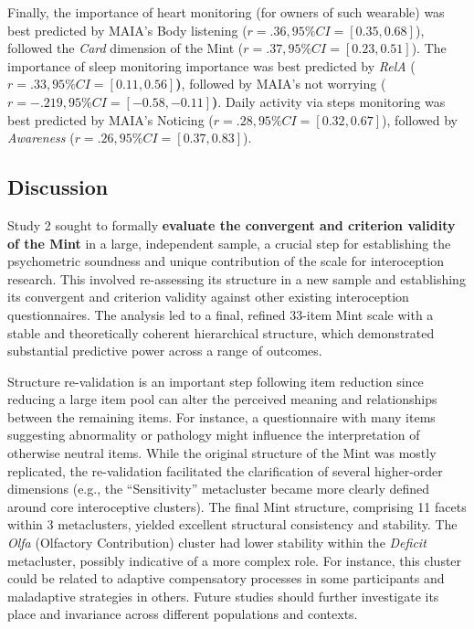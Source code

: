 \documentclass[
  man,
  floatsintext,
  longtable,
  nolmodern,
  notxfonts,
  notimes,
  mask,
  colorlinks=true,linkcolor=blue,citecolor=blue,urlcolor=blue]{apa7}
\begin{document}
Finally, the importance of heart monitoring (for owners of such
wearable) was best predicted by MAIA's Body listening
(\textbf{\(r = .36, 95\% CI = [0.35, 0.68]\)}), followed the \emph{Card}
dimension of the Mint (\textbf{\(r = .37, 95\% CI = [0.23, 0.51]\)}).
The importance of sleep monitoring importance was best predicted by
\emph{RelA} (\textbf{\(r = .33, 95\% CI = [0.11, 0.56]\))}, followed by
MAIA's not worrying (\textbf{\(r = -.219, 95\% CI = [-0.58, -0.11]\))}.
Daily activity via steps monitoring was best predicted by MAIA's
Noticing (\textbf{\(r = .28, 95\% CI = [0.32, 0.67]\)}), followed by
\emph{Awareness} (\textbf{\(r = .26, 95\% CI = [0.37, 0.83]\)}).

\subsection{Discussion}\label{discussion-1}

Study 2 sought to formally \textbf{evaluate the convergent and criterion
validity of the Mint} in a large, independent sample, a crucial step for
establishing the psychometric soundness and unique contribution of the
scale for interoception research. This involved re-assessing its
structure in a new sample and establishing its convergent and criterion
validity against other existing interoception questionnaires. The
analysis led to a final, refined 33-item Mint scale with a stable and
theoretically coherent hierarchical structure, which demonstrated
substantial predictive power across a range of outcomes.

Structure re-validation is an important step following item reduction
since reducing a large item pool can alter the perceived meaning and
relationships between the remaining items. For instance, a questionnaire
with many items suggesting abnormality or pathology might influence the
interpretation of otherwise neutral items. While the original structure
of the Mint was mostly replicated, the re-validation facilitated the
clarification of several higher-order dimensions (e.g., the
``Sensitivity'' metacluster became more clearly defined around core
interoceptive clusters). The final Mint structure, comprising 11 facets
within 3 metaclusters, yielded excellent structural consistency and
stability. The \emph{Olfa} (Olfactory Contribution) cluster had lower
stability within the \emph{Deficit} metacluster, possibly indicative of
a more complex role. For instance, this cluster could be related to
adaptive compensatory processes in some participants and maladaptive
strategies in others. Future studies should further investigate its
place and invariance across different populations and contexts.
\end{document}
